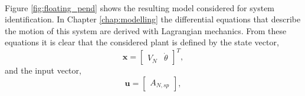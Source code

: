         \paragraph{}
        Figure \ref{fig:floating_pend} shows the resulting model considered for system identification.
        In Chapter \ref{chap:modelling} the differential equations that describe the motion of this system are derived with Lagrangian mechanics.
        From these equations it is clear that the considered plant is defined by the state vector,
        \begin{equation}
            \bm{x} = \begin{bmatrix}
                V_N & \dot{\theta}
            \end{bmatrix}^T,
        \end{equation}
        and the input vector,
        \begin{equation}
            \bm{u} = \begin{bmatrix}
                A_{N,sp}
            \end{bmatrix},
        \end{equation}



